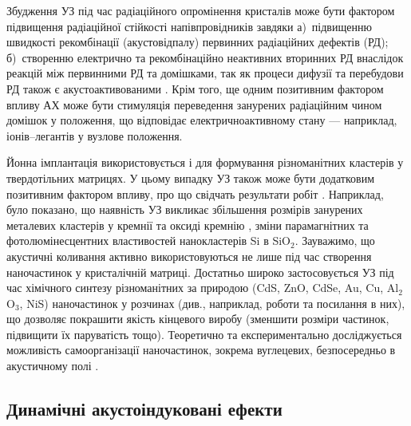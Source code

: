 Збудження УЗ під час радіаційного опромінення кристалів може бути фактором підвищення радіаційної стійкості напівпровідників завдяки
а)~підвищенню швидкості рекомбінації (акустовідпалу) первинних радіаційних дефектів (РД);
б)~створенню електрично та рекомбінаційно неактивних вторинних РД внаслідок реакцій між первинними РД та домішками, так як процеси дифузії та перебудови РД також є акустоактивованими \cite{YOlikh2006TPLr,Parchinskii2000r}.
Крім того, ще одним позитивним фактором впливу АХ може бути стимуляція переведення занурених радіаційним чином домішок у положення, що відповідає електричноактивному стану --- наприклад, іонів--легантів у вузлове положення.


 Йонна імплантація використовується і для формування різноманітних кластерів у твердотільних матрицях.
У цьому випадку УЗ також може бути додатковим позитивним фактором впливу, про що свідчать результати робіт \cite{Roman:2006JAP,Roman:2007APL,Roman:2010JAP,YOlikh2010JL}.
Наприклад, було показано, що наявність  УЗ  викликає збільшення розмірів занурених металевих кластерів у кремнії \cite{Roman:2006JAP} та оксиді кремнію \cite{Roman:2007APL}, зміни парамагнітних \cite{Roman:2010JAP} та фотолюмінесцентних \cite{YOlikh2010JL} властивостей нанокластерів Si в SiO$_2$.
Зауважимо, що акустичні коливання активно використовуються не лише під час створення наночастинок у кристалічній матриці.
Достатньо широко застосовується УЗ під час хімічного синтезу різноманітних за природою (CdS, ZnO, CdSe, Au, Cu, Al$_2$O$_3$, NiS) наночастинок у розчинах (див., наприклад, роботи \cite{US:nanoParticle,US:nanoCdSe,US:nanoCu,US:nanoCdS,US:nanoCdSNiS,US:nanoZnOAu} та посилання в них),
що дозволяє покрашити якість кінцевого виробу (зменшити розміри частинок, підвищити їх паруватість тощо).
Теоретично та експериментально досліджується можливість самоорганізації наночастинок, зокрема вуглецевих, безпосередньо в акустичному полі  \cite{US:nanoAPL2016,PhysRevLett106:076102}.



\subsection{Динамічні акустоіндуковані ефекти}

